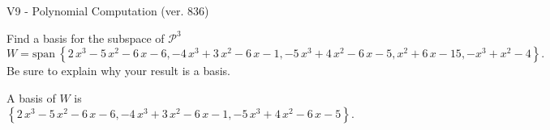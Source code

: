 \begin{exercise}
  \begin{exerciseTitle}V9 - Polynomial Computation (ver. 836)\end{exerciseTitle}
  \begin{exerciseStatement}
    Find a basis for the subspace of \(\mathcal{P}^3\) 
\[W=\mathrm{span}\ \left\{2 \, x^{3} - 5 \, x^{2} - 6 \, x - 6 , -4 \, x^{3} + 3 \, x^{2} - 6 \, x - 1 , -5 \, x^{3} + 4 \, x^{2} - 6 \, x - 5 , x^{2} + 6 \, x - 15 , -x^{3} + x^{2} - 4\right\}.\]
 Be sure to explain why your result is a basis.


  \end{exerciseStatement}
  \begin{exerciseAnswer}
   A basis of \(W\) is  \(\left\{2 \, x^{3} - 5 \, x^{2} - 6 \, x - 6 , -4 \, x^{3} + 3 \, x^{2} - 6 \, x - 1 , -5 \, x^{3} + 4 \, x^{2} - 6 \, x - 5\right\}\).
  


  \end{exerciseAnswer}
\end{exercise}